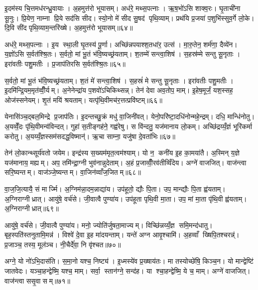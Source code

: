 इ॒दम॑स्य चि॒त्तमध॑रन्ध्रु॒वायाः। अ॒हमुत्त॑रो भूयासम्। अध॑रे॒ मथ्स॒पत्नाः। ऋ॒ष॒भो॑ऽसि शाक्व॒रः। घृ॒ताची॑ना सू॒नुः। प्रि॒येण॒ नाम्ना प्रि॒ये सद॑सि सीद। स्यो॒नो मे॑ सीद सु॒षद॑ पृथि॒व्याम्। प्रथ॑यि प्र॒जया॑ प॒शुभि॑स्सुव॒र्गे लो॒के। दि॒वि सी॑द पृथि॒व्याम॒न्तरि॑ख्षे। अ॒हमुत्त॑रो भूयासम्॥६४॥

अध॑रे॒ मथ्स॒पत्नाः। इ॒य स्था॒ली घृ॒तस्य॑ पू॒र्णा। अच्छि॑न्नपयाश्श॒तधा॑र॒ उत्स॑। मा॒रु॒तेन॒ शर्म॑णा॒ दैव्ये॑न। य॒ज्ञो॑ऽसि स॒र्वत॑श्श्रि॒तः। स॒र्वतो॒ मां भू॒तं भ॑वि॒ष्यच्छ्र॑यताम्। श॒तम्मे॑ सन्त्वा॒शिष॑। स॒हस्र॑म्मे सन्तु सू॒नृताः। इरा॑वतीः पशु॒मतीः। प्र॒जाप॑तिरसि स॒र्वत॑श्श्रि॒तः॥६५॥

स॒र्वतो॒ मां भू॒तं भ॑वि॒ष्यच्छ्र॑यताम्। श॒तं मे॑ सन्त्वा॒शिष॑। स॒हस्रं॑ मे सन्तु सू॒नृताः। इरा॑वतीः पशु॒मतीः। इ॒दमि॑न्द्रि॒यम॒मृत॑व्वीँ॒र्यम्। अ॒नेनेन्द्रा॑य प॒शवो॑ऽचिकिथ्सन्न्। तेन॑ देवा अव॒तोप॒ माम्। इ॒हेष॒मूर्जं॒ यश॒स्सह॒ ओज॑स्सनेयम्। शृ॒तं मयि॑ श्रयताम्। यत्पृ॑थि॒वीमच॑र॒त्तत्प्रवि॑ष्टम्॥६६॥

येनासि॑ञ्च॒द्बल॒मिन्द्रे प्र॒जाप॑तिः। इ॒दन्तच्छु॒क्रं मधु॑ वा॒जिनी॑वत्। येनो॒परि॑ष्टा॒दधि॑नोन्महे॒न्द्रम्। दधि॒ मान्धि॑नोतु। अ॒यव्वेँ॒दः पृ॑थि॒वीमन्व॑विन्दत्। गुहा॑ स॒तीङ्गह॑ने॒ गह्व॑रेषु। स वि॑न्दतु॒ यज॑मानाय लो॒कम्। अच्छि॑द्रय्यँ॒ज्ञं भूरि॑कर्मा करोतु। अ॒यय्यँ॒ज्ञस्सम॑सदद्ध॒विष्मान्॑। ऋ॒चा साम्ना॒ यजु॑षा दे॒वता॑भिः॥६७॥

तेन॑ लो॒कान्थ्सूर्य॑वतो जयेम। इन्द्र॑स्य स॒ख्यम॑मृत॒त्वम॑श्याम्। यो न॒ कनी॑य इ॒ह का॒मया॑तै। अ॒स्मिन् य॒ज्ञे यज॑मानाय॒ मह्यम्। अप॒ तमि॑न्द्रा॒ग्नी भुव॑नान्नुदेताम्। अ॒हं प्र॒जाव्वीँ॒रव॑तीव्विँदेय। अग्ने॑ वाजजित्। वाज॑न्त्वा सरि॒ष्यन्तम्। वाज॑ञ्जे॒ष्यन्तम्। वा॒जिन॑व्वाँज॒जितम्॥६८॥

वा॒ज॒जि॒त्यायै॒ सं मार्ज्मि। अ॒ग्निम॑न्ना॒दम॒न्नाद्या॑य। उप॑हूतो॒ द्यौः पि॒ता। उप॒ मान्द्यौः पि॒ता ह्व॑यताम्। अ॒ग्निराग्नीध्रात्। आयु॑षे॒ वर्च॑से। जी॒वात्वै पुण्या॑य। उप॑हूता पृथि॒वी मा॒ता। उप॒ मां मा॒ता पृ॑थि॒वी ह्व॑यताम्। अ॒ग्निराग्नीध्रात्॥६९॥

आयु॑षे॒ वर्च॑से। जी॒वात्वै पुण्या॑य। मनो॒ ज्योति॑र्जुषता॒माज्यम्। विच्छि॑न्नय्यँ॒ज्ञ समि॒मन्द॑धातु। बृह॒स्पति॑स्तनुतामि॒मन्न॑। विश्वे॑ दे॒वा इ॒ह मा॑दयन्ताम्। यन्ते॑ अग्न आवृ॒श्चामि॑। अ॒हव्वाँ ख्षिपि॒तश्चरन्न्॑। प्र॒जाञ्च॒ तस्य॒ मूल॑ञ्च। नी॒चैर्दे॑वा॒ नि वृ॑श्चत॥७०॥

अग्ने॒ यो नो॑ऽभि॒दास॑ति। स॒मा॒नो यश्च॒ निष्ट्य॑। इ॒ध्मस्ये॑व प्र॒ख्षाय॑तः। मा तस्योच्छे॑षि॒ किञ्च॒न। यो मान्द्वेष्टि॑ जातवेदः। यञ्चा॒हन्द्वेष्मि॒ यश्च॒ माम्। सर्वा॒ स्तान॑ग्ने॒ सन्द॑ह। या श्चा॒हन्द्वेष्मि॒ ये च॒ माम्। अग्ने॑ वाजजित्। वाज॑न्त्वा ससृ॒वासम्॥७१॥

